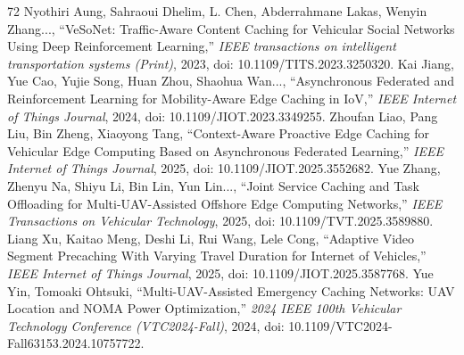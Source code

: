 \documentclass[journal]{IEEEtran}
\begin{document}
\begin{thebibliography}{72}
Nyothiri Aung, Sahraoui Dhelim, L. Chen, Abderrahmane Lakas, Wenyin Zhang..., ``VeSoNet: Traffic-Aware Content Caching for Vehicular Social Networks Using Deep Reinforcement Learning,'' \textit{IEEE transactions on intelligent transportation systems (Print)}, 2023, doi: 10.1109/TITS.2023.3250320.
Kai Jiang, Yue Cao, Yujie Song, Huan Zhou, Shaohua Wan..., ``Asynchronous Federated and Reinforcement Learning for Mobility-Aware Edge Caching in IoV,'' \textit{IEEE Internet of Things Journal}, 2024, doi: 10.1109/JIOT.2023.3349255.
Zhoufan Liao, Pang Liu, Bin Zheng, Xiaoyong Tang, ``Context-Aware Proactive Edge Caching for Vehicular Edge Computing Based on Asynchronous Federated Learning,'' \textit{IEEE Internet of Things Journal}, 2025, doi: 10.1109/JIOT.2025.3552682.
Yue Zhang, Zhenyu Na, Shiyu Li, Bin Lin, Yun Lin..., ``Joint Service Caching and Task Offloading for Multi-UAV-Assisted Offshore Edge Computing Networks,'' \textit{IEEE Transactions on Vehicular Technology}, 2025, doi: 10.1109/TVT.2025.3589880.
Liang Xu, Kaitao Meng, Deshi Li, Rui Wang, Lele Cong, ``Adaptive Video Segment Precaching With Varying Travel Duration for Internet of Vehicles,'' \textit{IEEE Internet of Things Journal}, 2025, doi: 10.1109/JIOT.2025.3587768.
Yue Yin, Tomoaki Ohtsuki, ``Multi-UAV-Assisted Emergency Caching Networks: UAV Location and NOMA Power Optimization,'' \textit{2024 IEEE 100th Vehicular Technology Conference (VTC2024-Fall)}, 2024, doi: 10.1109/VTC2024-Fall63153.2024.10757722.


\end{thebibliography}
\end{document}
